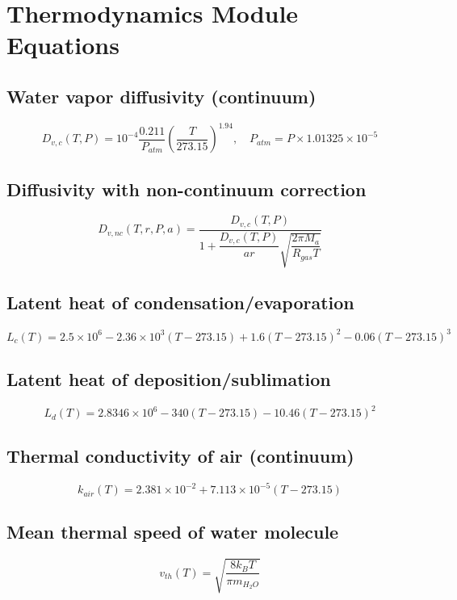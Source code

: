 \documentclass{article}
\begin{document}
\section*{Thermodynamics Module Equations}

\subsection*{Water vapor diffusivity (continuum)}
\begin{equation}
D_{v,c}(T,P)=10^{-4}\frac{0.211}{P_{atm}}\left(\frac{T}{273.15}\right)^{1.94},\quad P_{atm}=P\times1.01325\times10^{-5}
\end{equation}

\subsection*{Diffusivity with non-continuum correction}
\begin{equation}
D_{v,nc}(T,r,P,a)=\frac{D_{v,c}(T,P)}{1+\dfrac{D_{v,c}(T,P)}{a r}\sqrt{\dfrac{2\pi M_a}{R_{gas}T}}}
\end{equation}

\subsection*{Latent heat of condensation/evaporation}
\begin{equation}
L_{c}(T)=2.5\times10^{6}-2.36\times10^{3}(T-273.15)+1.6(T-273.15)^{2}-0.06(T-273.15)^{3}
\end{equation}

\subsection*{Latent heat of deposition/sublimation}
\begin{equation}
L_{d}(T)=2.8346\times10^{6}-340(T-273.15)-10.46(T-273.15)^{2}
\end{equation}

\subsection*{Thermal conductivity of air (continuum)}
\begin{equation}
k_{air}(T)=2.381\times10^{-2}+7.113\times10^{-5}(T-273.15)
\end{equation}

\subsection*{Mean thermal speed of water molecule}
\begin{equation}
v_{th}(T)=\sqrt{\frac{8 k_{B} T}{\pi m_{H_2O}}}
\end{equation}
\end{document}
